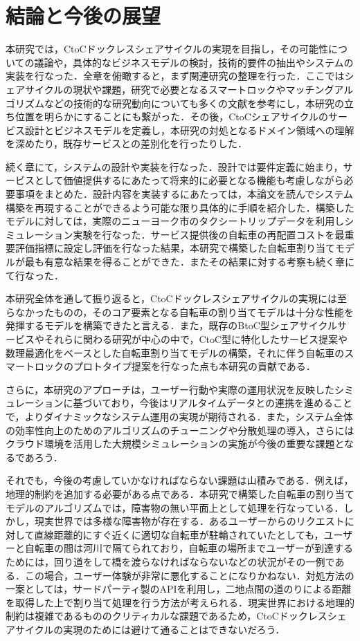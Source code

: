 \section{結論と今後の展望}
  \label{sec:結論と今後の展望}  
    \par 本研究では，CtoCドックレスシェアサイクルの実現を目指し，その可能性についての議論や，具体的なビジネスモデルの検討，技術的要件の抽出やシステムの実装を行なった．全章を俯瞰すると，まず関連研究の整理を行った．ここではシェアサイクルの現状や課題，研究で必要となるスマートロックやマッチングアルゴリズムなどの技術的な研究動向についても多くの文献を参考にし，本研究の立ち位置を明らかにすることにも繋がった．その後，CtoCシェアサイクルのサービス設計とビジネスモデルを定義し，本研究の対処となるドメイン領域への理解を深めたり，既存サービスとの差別化を行ったりした．
    \par 続く章にて，システムの設計や実装を行なった．設計では要件定義に始まり，サービスとして価値提供するにあたって将来的に必要となる機能も考慮しながら必要事項をまとめた．設計内容を実装するにあたっては，本論文を読んでシステム構築を再現することができるよう可能な限り具体的に手順を紹介した．構築したモデルに対しては，実際のニューヨーク市のタクシートリップデータを利用しシミュレーション実験を行なった．サービス提供後の自転車の再配置コストを最重要評価指標に設定し評価を行なった結果，本研究で構築した自転車割り当てモデルが最も有意な結果を得ることができた．またその結果に対する考察も続く章にて行なった．
    \par 本研究全体を通して振り返ると，CtoCドックレスシェアサイクルの実現には至らなかったものの，そのコア要素となる自転車の割り当てモデルは十分な性能を発揮するモデルを構築できたと言える．また，既存のBtoC型シェアサイクルサービスやそれらに関わる研究が中心の中で，CtoC型に特化したサービス提案や数理最適化をベースとした自転車割り当てモデルの構築，それに伴う自転車のスマートロックのプロトタイプ提案を行なった点も本研究の貢献である．
    \par さらに，本研究のアプローチは，ユーザー行動や実際の運用状況を反映したシミュレーションに基づいており，今後はリアルタイムデータとの連携を進めることで，よりダイナミックなシステム運用の実現が期待される．また，システム全体の効率性向上のためのアルゴリズムのチューニングや分散処理の導入，さらにはクラウド環境を活用した大規模シミュレーションの実施が今後の重要な課題となるであろう．
    \par それでも，今後の考慮していかなければならない課題は山積みである．例えば，地理的制約を追加する必要がある点である．本研究で構築した自転車の割り当てモデルのアルゴリズムでは，障害物の無い平面上として処理を行なっている．しかし，現実世界では多様な障害物が存在する．あるユーザーからのリクエストに対して直線距離的にすぐ近くに適切な自転車が駐輪されていたとしても，ユーザーと自転車の間は河川で隔てられており，自転車の場所までユーザーが到達するためには，回り道をして橋を渡らなければならないなどの状況がその一例である．この場合，ユーザー体験が非常に悪化することになりかねない．対処方法の一案としては，サードパーティ製のAPIを利用し，二地点間の道のりによる距離を取得した上で割り当て処理を行う方法が考えられる．現実世界における地理的制約は複雑であるもののクリティカルな課題であるため，CtoCドックレスシェアサイクルの実現のためには避けて通ることはできないだろう．
